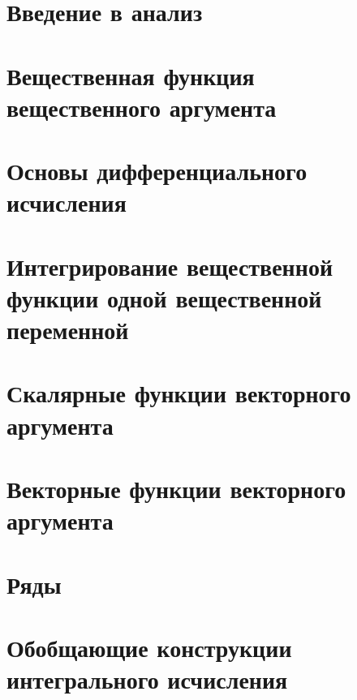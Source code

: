 
\LARGE


\tableofcontents %
\LARGE

\chapter{Введение в анализ}

\chapter{Вещественная функция вещественного аргумента}

\chapter{Основы дифференциального исчисления}

\chapter{Интегрирование вещественной функции одной вещественной переменной}

\chapter{Скалярные функции векторного аргумента}

\chapter{Векторные функции векторного аргумента}

\chapter{Ряды}

\chapter{Обобщающие конструкции интегрального исчисления}


